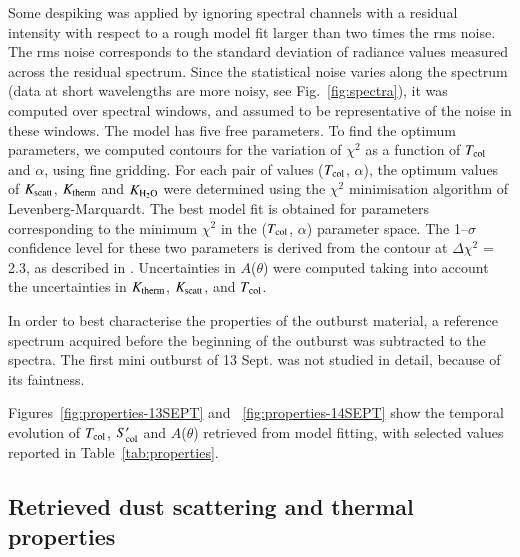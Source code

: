 \documentclass[a4paper,fleqn,usenatbib]{mnras}
\begin{document}

Some despiking was applied by ignoring spectral channels
with a residual intensity with respect  to a rough model fit
larger than two times the rms noise. The rms noise corresponds to
the standard deviation of radiance values measured across the
residual spectrum. Since the statistical noise varies along the
spectrum (data at short wavelengths are more noisy, see
Fig.~\ref{fig:spectra}), it was computed over spectral windows,
and assumed to be representative of the noise in these windows.
The model has five
free parameters. To find the optimum parameters, we computed
contours for the variation of $\chi^2$ as a function of $T_{\rm
col}$ and $\alpha$, using fine gridding. For each pair of values
($T_{\rm col}$, $\alpha$), the optimum values of $K_{\rm
scatt}$, $K_{\rm therm}$ and $K_{\rm H_2O}$ were determined using
the $\chi^2$ minimisation algorithm of Levenberg-Marquardt. The
best model fit is obtained for parameters corresponding to the
minimum $\chi^2$ in the ($T_{\rm col}$, $\alpha$) parameter
space. The 1--$\sigma$ confidence level for these two parameters
is derived from the contour at $\Delta\chi^2$ = 2.3, as described
in \citet{Bevington}. Uncertainties in $A$($\theta$) were computed
taking into account the uncertainties in $K_{\rm therm}$, $K_{\rm
scatt}$, and $T_{\rm col}$.

In order to best characterise the properties of the outburst
material, a reference spectrum acquired before the beginning of the outburst was subtracted to the spectra.
The first mini outburst of 13 Sept. was not studied in detail,
because of its faintness.



Figures~\ref{fig:properties-13SEPT} and ~\ref{fig:properties-14SEPT} show the
temporal evolution of $T_{\rm col}$, $S'_{\rm col}$ and
$A$($\theta$) retrieved from model fitting, with selected values reported in Table~\ref{tab:properties}.

\subsection{Retrieved dust scattering and thermal properties}
\label{sec:properties}
\end{document}
